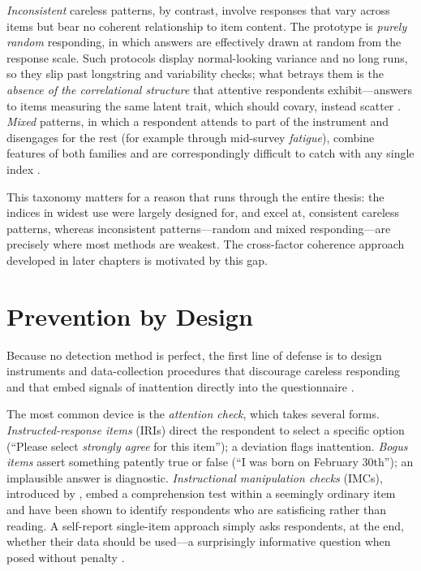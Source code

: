 \emph{Inconsistent} careless patterns, by contrast, involve responses that vary
across items but bear no coherent relationship to item content. The prototype is
\emph{purely random} responding, in which answers are effectively drawn at
random from the response scale. Such protocols display normal-looking variance
and no long runs, so they slip past longstring and variability checks; what
betrays them is the \emph{absence of the correlational structure} that attentive
respondents exhibit---answers to items measuring the same latent trait, which
should covary, instead scatter \parencite{meade2012identifying, curran2016methods}.
\emph{Mixed} patterns, in which a respondent attends to part of the instrument
and disengages for the rest (for example through mid-survey
\emph{fatigue}), combine features of both families and are correspondingly
difficult to catch with any single index \parencite{ward2023dealing}.

This taxonomy matters for a reason that runs through the entire thesis: the
indices in widest use were largely designed for, and excel at, consistent
careless patterns, whereas inconsistent patterns---random and mixed
responding---are precisely where most methods are weakest. The cross-factor
coherence approach developed in later chapters is motivated by this gap.

\section{Prevention by Design}

Because no detection method is perfect, the first line of defense is to design
instruments and data-collection procedures that discourage careless responding
and that embed signals of inattention directly into the questionnaire
\parencite{ward2023dealing, desimone2015best}.

The most common device is the \emph{attention check}, which takes several forms.
\emph{Instructed-response items} (IRIs) direct the respondent to select a
specific option (``Please select \emph{strongly agree} for this item''); a
deviation flags inattention. \emph{Bogus items} assert something patently true
or false (``I was born on February 30th''); an implausible answer is
diagnostic. \emph{Instructional manipulation checks} (IMCs), introduced by
\textcite{oppenheimer2009instructional}, embed a comprehension test within a
seemingly ordinary item and have been shown to identify respondents who are
satisficing rather than reading. A self-report single-item approach simply asks
respondents, at the end, whether their data should be used---a surprisingly
informative question when posed without penalty \parencite{meade2012identifying}.

